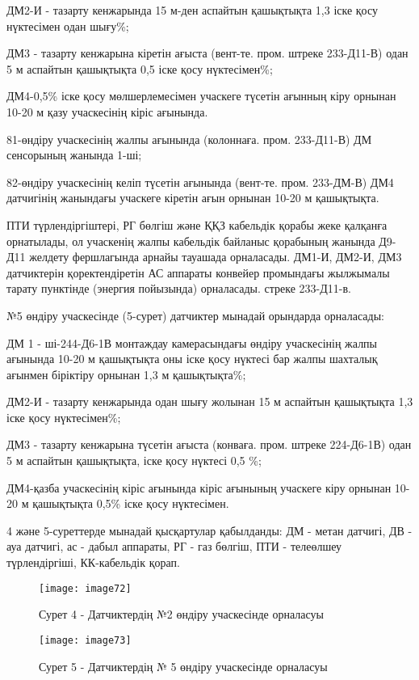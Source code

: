 \begin{multicols}{2}
ДМ2-И - тазарту кенжарында 15 м-ден аспайтын қашықтықта 1,3 іске қосу
нүктесімен одан шығу\%;

ДМ3 - тазарту кенжарына кіретін ағыста (вент-те. пром. штреке 233-Д11-В)
одан 5 м аспайтын қашықтықта 0,5 іске қосу нүктесімен\%;

ДМ4-0,5\% іске қосу мөлшерлемесімен учаскеге түсетін ағынның кіру
орнынан 10-20 м қазу учаскесінің кіріс ағынында.

81-өндіру учаскесінің жалпы ағынында (колоннаға. пром. 233-Д11-В) ДМ
сенсорының жанында 1-ші;

82-өндіру учаскесінің келіп түсетін ағынында (вент-те. пром. 233-ДМ-В)
ДМ4 датчигінің жанындағы учаскеге кіретін ағын орнынан 10-20 м
қашықтықта.

ПТИ түрлендіргіштері, РГ бөлгіш және ҚҚЗ кабельдік қорабы жеке қалқанға
орнатылады, ол учаскенің жалпы кабельдік байланыс қорабының жанында
Д9-Д11 желдету фершлагында арнайы тауашада орналасады. ДМ1-И, ДМ2-И, ДМ3
датчиктерін қоректендіретін АС аппараты конвейер промындағы жылжымалы
тарату пунктінде (энергия пойызында) орналасады. стреке 233-Д11-в.

№5 өндіру учаскесінде (5-сурет) датчиктер мынадай орындарда орналасады:

ДМ 1 - ші-244-Д6-1В монтаждау камерасындағы өндіру учаскесінің жалпы
ағынында 10-20 м қашықтықта оны іске қосу нүктесі бар жалпы шахталық
ағынмен біріктіру орнынан 1,3 м қашықтықта\%;

ДМ2-И - тазарту кенжарында одан шығу жолынан 15 м аспайтын қашықтықта
1,3 іске қосу нүктесімен\%;

ДМ3 - тазарту кенжарына түсетін ағыста (конваға. пром. штреке 224-Д6-1В)
одан 5 м аспайтын қашықтықта, іске қосу нүктесі 0,5 \%;

ДМ4-қазба учаскесінің кіріс ағынында кіріс ағынының учаскеге кіру
орнынан 10-20 м қашықтықта 0,5\% іске қосу нүктесімен.

4 және 5-суреттерде мынадай қысқартулар қабылданды: ДМ - метан датчигі,
ДВ - ауа датчигі, ас - дабыл аппараты, РГ - газ бөлгіш, ПТИ -
телеөлшеу түрлендіргіші, КК-кабельдік қорап.
\end{multicols}

\begin{figure}[H]
    \centering
    \texttt{[image: image72]}
    \caption*{Сурет 4 - Датчиктердің №2 өндіру учаскесінде орналасуы}
\end{figure}
\begin{figure}[H]
    \centering
    \texttt{[image: image73]}
    \caption*{Сурет 5 - Датчиктердің № 5 өндіру учаскесінде орналасуы}
\end{figure}

